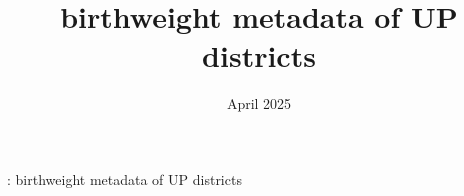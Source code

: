 \documentclass{article}
\title{birthweight metadata of UP districts}
\date{April 2025}
\begin{document}
\begin{table}[H]
    \centering
    \caption{: birthweight metadata of UP districts}
    \label{tab:sumstat}
\end{table}
\end{document}
